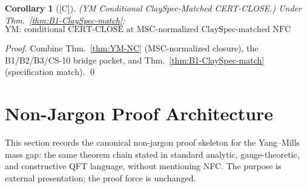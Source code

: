 \documentclass[12pt,oneside]{amsbook}
\theoremstyle{plain}
\newtheorem{corollary}[theorem]{Corollary}
\theoremstyle{definition}
\theoremstyle{remark}
\newcommand{\status}[1]{\textup{[#1]}}
\begin{document}
\begin{corollary}[\status{C}]\label{cor:YM-ClaySpec-conditional-close}
\textup{(YM Conditional ClaySpec-Matched CERT-CLOSE.)}
Under Thm.~\ref{thm:B1-ClaySpec-match}:
\[
 \boxed{\text{YM: conditional CERT-CLOSE at MSC-normalized
 ClaySpec-matched NFC scope.}}
\]
\end{corollary}

\begin{proof}
Combine Thm.~\ref{thm:YM-NC} (MSC-normalized closure),
the B1/B2/B3/CS-10 bridge packet, and Thm.~\ref{thm:B1-ClaySpec-match}
(specification match).
\qed
\end{proof}

\section{Non-Jargon Proof Architecture}\label{sec:nonjargon}

This section records the canonical non-jargon proof skeleton for the
Yang--Mills mass gap: the same theorem chain stated in standard
analytic, gauge-theoretic, and constructive QFT language, without
mentioning NFC. The purpose is external presentation; the proof
force is unchanged.
\end{document}
